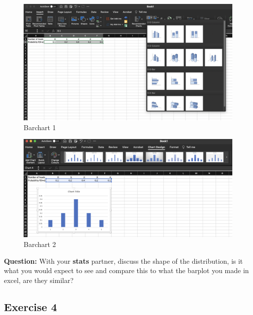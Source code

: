 \documentclass[
  10pt,
  letterpaper,
  DIV=11,
  numbers=noendperiod]{scrartcl}
\begin{document}
\begin{figure}

{\centering \includegraphics{images/Barchart_1.png}

}

\caption{Barchart 1}

\end{figure}

\begin{figure}

{\centering \includegraphics{images/Barchart_2.png}

}

\caption{Barchart 2}

\end{figure}

\textbf{Question:} With your \textbf{stats} partner, discuss the shape
of the distribution, is it what you would expect to see and compare this
to what the barplot you made in excel, are they similar?

\hypertarget{exercise-4}{%
\subsection{Exercise 4}\label{exercise-4}}
\end{document}
